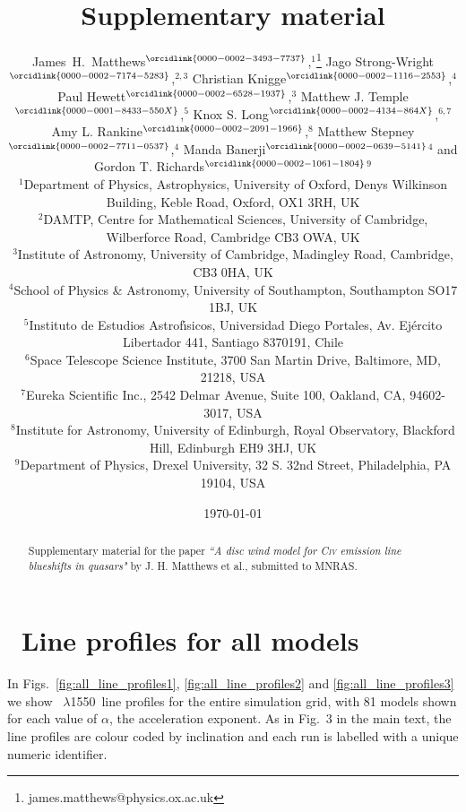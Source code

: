 \documentclass[fleqn,usenatbib,onecolumn]{mnras}
\title
[Supplementary material]
{
Supplementary material
}
\author[J. H. Matthews et al.]
{James~H.~Matthews$^{\orcidlink{0000-0002-3493-7737}}$,$^{1}$\thanks{james.matthews@physics.ox.ac.uk}
Jago Strong-Wright$^{\orcidlink{0000-0002-7174-5283}}$,$^{2,3}$
Christian Knigge$^{\orcidlink{0000-0002-1116-2553}}$,$^{4}$
Paul Hewett$^{\orcidlink{0000-0002-6528-1937}}$,$^{3}$
\newauthor
Matthew J. Temple$^{\orcidlink{0000-0001-8433-550X}}$,$^{5}$ 
Knox S. Long$^{\orcidlink{0000-0002-4134-864X}}$,$^{6,7}$ 
Amy L. Rankine$^{\orcidlink{0000-0002-2091-1966}}$,$^{8}$
Matthew Stepney$^{\orcidlink{0000-0002-7711-0537}}$,$^{4}$
Manda Banerji$^{\orcidlink{0000-0002-0639-5141}}$$^{4}$ \newauthor
and
Gordon T. Richards$^{\orcidlink{0000-0002-1061-1804}}$$^{9}$
\\$^1$Department of Physics, Astrophysics, University of Oxford, Denys Wilkinson Building, Keble Road, Oxford, OX1 3RH, UK
\\$^2$DAMTP, Centre for Mathematical Sciences, University of Cambridge, Wilberforce Road, Cambridge CB3 OWA, UK
\\$^3$Institute of Astronomy, University of Cambridge, Madingley Road, Cambridge, CB3 0HA, UK
\\$^{4}$School of Physics \& Astronomy, University of Southampton, Southampton SO17 1BJ, UK
\\$^{5}$Instituto de Estudios Astrof\'{\i}sicos, Universidad Diego Portales, Av. Ej\'ercito Libertador 441, Santiago 8370191, Chile\\
$^{6}$Space Telescope Science Institute, 3700 San Martin Drive, Baltimore, MD, 21218, USA\\
$^{7}$Eureka Scientific Inc., 2542 Delmar Avenue, Suite 100, Oakland, CA, 94602-3017, USA\\
$^{8}$Institute for Astronomy, University of Edinburgh, Royal Observatory, Blackford Hill, Edinburgh EH9 3HJ, UK\\
$^{9}$Department of Physics, Drexel University, 32 S. 32nd Street, Philadelphia, PA 19104, USA\\
}
\date{\today}
\newcommand{\civ}{\ion{C}{iv}}
\newcommand{\civline}{\ion{C}{iv}~$\lambda$1550}
\begin{document}
\label{firstpage}
\pagerange{\pageref{firstpage}--\pageref{lastpage}}
\maketitle

\begin{abstract}
Supplementary material for the paper {\sl ``A disc wind model for C\textsc{iv} emission line blueshifts in quasars"} by J. H. Matthews et al., submitted to MNRAS. 
\end{abstract}


\renewcommand{\thefigure}{S\arabic{figure}}
\section{\civ\ Line profiles for all models}

In Figs.~\ref{fig:all_line_profiles1}, \ref{fig:all_line_profiles2} and \ref{fig:all_line_profiles3} we show \civline\ line profiles for the entire simulation grid, with 81 models shown for each value of $\alpha$, the acceleration exponent. As in Fig.~3 in the main text, the line profiles are colour coded by inclination and each run is labelled with a unique numeric identifier. 
\end{document}
